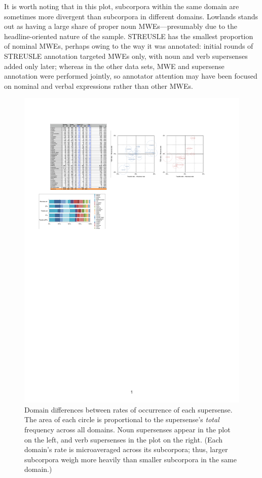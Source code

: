 \documentclass[11pt,letterpaper]{article}
\begin{document}
It is worth noting that in this plot, subcorpora within the same domain 
are sometimes more divergent than subcorpora in different domains. 
Lowlands stands out as having a large share of proper noun MWEs---presumably due to the headline-oriented 
nature of the sample. STREUSLE has the smallest proportion of nominal MWEs, 
perhaps owing to the way it was annotated: 
initial rounds of STREUSLE annotation targeted MWEs only, with noun and verb supersenses 
added only later; whereas in the other data sets, MWE and supersense annotation were performed jointly, 
so annotator attention may have been focused on nominal and verbal expressions 
rather than other MWEs.

\begin{figure}
\includegraphics[width=\textwidth]{figs/supersense-domains.pdf}
\caption{Domain differences between rates of occurrence of each supersense. 
The area of each circle is proportional to the supersense's \emph{total} frequency across all domains.
Noun supersenses appear in the plot on the left, and verb supersenses in the plot on the right. 
(Each domain's rate is microaveraged across its subcorpora; 
thus, larger subcorpora weigh more heavily than smaller subcorpora in the same domain.)}
\label{fig:supersense-domains}
\end{figure}
\end{document}
